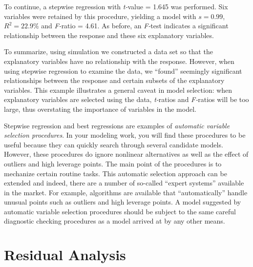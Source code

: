 To continue, a stepwise regression with \textit{t-}value = 1.645 was
performed. Six variables were retained by this procedure, yielding a
model with $s=0.99$, $R^2=22.9\%$ and \textit{F-}ratio = 4.61. As
before, an \textit{F-}test indicates a significant relationship
between the response and these six explanatory variables.


To summarize, using simulation we constructed a data set so that the
explanatory variables have no relationship with the response.
However, when using stepwise regression to examine the data, we
``found'' seemingly significant relationships between the response
and certain subsets of the explanatory variables. This example
illustrates a general caveat in model selection: when explanatory
variables are selected using the data, \textit{t-}ratios and
\textit{F-}ratios will be too large, thus overstating the importance
of variables in the model.

\linejed

\newpage


Stepwise regression and best regressions are examples of
\textit{automatic variable selection procedures}. In your modeling
work, you will find these procedures to be useful because they can
quickly search through several candidate models. However, these
procedures do ignore nonlinear alternatives as well as the effect of
outliers and high leverage points. The main point of the procedures
is to mechanize certain routine tasks. This automatic selection
approach can be extended and indeed, there are a number of so-called
``expert systems'' available in the market. For example, algorithms
are available that ``automatically'' handle unusual points such as
outliers and high leverage points. A model suggested by automatic
variable selection procedures should be subject to the same careful
diagnostic checking procedures as a model arrived at by any other
means. 

\section{Residual Analysis}\label{S5:ResidualAnalysis}

